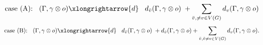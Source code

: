 \[ \text{case (A): \;\;} (\Gamma,\gamma\otimes o) \xlongrightarrow{d} \hspace{.3cm} d_{\bar{v}}(\Gamma,\gamma\otimes o) \hspace{.1cm}  + \sum_{\bar{v},\neq v\in V(G)} d_v(\Gamma,\gamma\otimes o) \]
\[ \text{case (B): \;\;} (\Gamma,\gamma\otimes o) \xlongrightarrow{d} \hspace{.3cm} d_{\bar{v}}(\Gamma,\gamma\otimes o) \hspace{.1cm}  + d_{\tilde{v}}(\Gamma,\gamma\otimes o) +\sum_{\bar{v},\tilde{v}\neq v\in V(G)} d_v(\Gamma,\gamma\otimes o). \]
